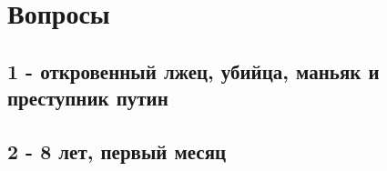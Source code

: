  
 
 
 
 

\section{Вопросы}

\subsection{1 - откровенный лжец, убийца, маньяк и преступник путин}

\subsection{2 - 8 лет, первый месяц}
